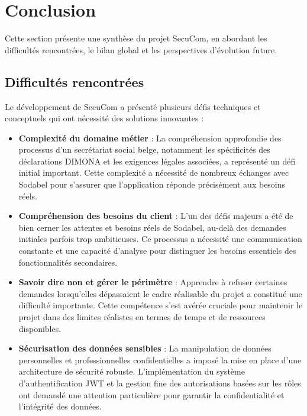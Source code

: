 \chapter{Conclusion}

Cette section présente une synthèse du projet SecuCom, en abordant les difficultés rencontrées, le bilan global et les perspectives d'évolution future.

\section{Difficultés rencontrées}

Le développement de SecuCom a présenté plusieurs défis techniques et conceptuels qui ont nécessité des solutions innovantes :

\begin{itemize}
  \item \textbf{Complexité du domaine métier} : La compréhension approfondie des processus d'un secrétariat social belge, notamment les spécificités des déclarations DIMONA et les exigences légales associées, a représenté un défi initial important. Cette complexité a nécessité de nombreux échanges avec Sodabel pour s'assurer que l'application réponde précisément aux besoins réels.

  \item \textbf{Compréhension des besoins du client} : L'un des défis majeurs a été de bien cerner les attentes et besoins réels de Sodabel, au-delà des demandes initiales parfois trop ambitieuses. Ce processus a nécessité une communication constante et une capacité d'analyse pour distinguer les besoins essentiels des fonctionnalités secondaires.

  \item \textbf{Savoir dire non et gérer le périmètre} : Apprendre à refuser certaines demandes lorsqu'elles dépassaient le cadre réalisable du projet a constitué une difficulté importante. Cette compétence s'est avérée cruciale pour maintenir le projet dans des limites réalistes en termes de temps et de ressources disponibles.

  \item \textbf{Sécurisation des données sensibles} : La manipulation de données personnelles et professionnelles confidentielles a imposé la mise en place d'une architecture de sécurité robuste. L'implémentation du système d'authentification JWT et la gestion fine des autorisations basées sur les rôles ont demandé une attention particulière pour garantir la confidentialité et l'intégrité des données.


\end{itemize}
